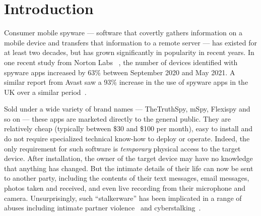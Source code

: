 \documentclass[sigconf,balance=false]{acmart}
\begin{document}
\maketitle

\section{Introduction}

Consumer mobile spyware --- software that covertly gathers information
on a mobile device and transfers that information to a remote server
--- has existed for at least two decades, but has grown significantly
in popularity in recent years.  In one recent study from Norton Labs
~\cite{AYearAft87:online}, the number of devices identified with
spyware apps increased by 63\% between September 2020 and May 2021. A
similar report from Avast saw a 93\% increase in the use of spyware
apps in the UK over a similar period~\cite{UseofSta91:online}.

Sold under a wide variety of brand names --- TheTruthSpy, mSpy,
Flexispy and so on --- these apps are marketed directly to the general
public.  They are relatively cheap (typically between \$30 and \$100
per month), easy to install and do not require specialized technical
know-how to deploy or operate.  Indeed, the only requirement for such
software is \emph{temporary} physical access to the target device.  After
installation, the owner of the target device may have no knowledge
that anything has changed.  But the intimate details of their life can
now be sent to another party, including the contents of their text
messages, email messages, photos taken and received, and even live
recording from their microphone and camera.  Unsurprisingly, such
``stalkerware'' has been implicated in a range of abuses including
intimate partner violence~\cite{chatterjee2018spyware} and
cyberstalking~\cite{woodlock2017abuse}.
\end{document}
